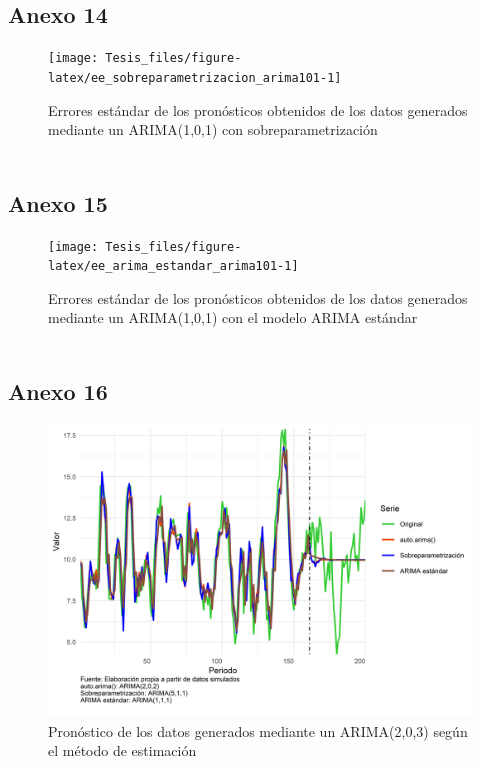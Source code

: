 \documentclass[
]{article}
\begin{document}
\subsection{Anexo 14}

\begin{figure}[H]
\texttt{[image: Tesis\_files/figure-latex/ee\_sobreparametrizacion\_arima101-1]} \caption{Errores estándar de los pronósticos obtenidos de los datos generados mediante un ARIMA(1,0,1) con sobreparametrización \textcolor{white}{prueba de aaaaaaaaaaaaaaaaaaaaaaa}}\label{fig:ee_sobreparametrizacion_arima101}
\end{figure}

\subsection{Anexo 15}

\begin{figure}[H]
\texttt{[image: Tesis\_files/figure-latex/ee\_arima\_estandar\_arima101-1]} \caption{Errores estándar de los pronósticos obtenidos de los datos generados mediante un ARIMA(1,0,1) con el modelo ARIMA estándar \textcolor{white}{prueba de aaaaaaaaaaaaaaaaaaaaaaa}}\label{fig:ee_arima_estandar_arima101}
\end{figure}

\subsection{Anexo 16}

\begin{figure}[H]
\includegraphics[width=1\linewidth,height=1\textheight]{Tesis_files/figure-latex/pronostico_arima203-1} \caption{Pronóstico de los datos generados mediante un ARIMA(2,0,3) según el método de estimación \textcolor{white}{prueba de aaaaaaaaaaaaaaaaaaaaaaa}}\label{fig:pronostico_arima203}
\end{figure}
\end{document}
